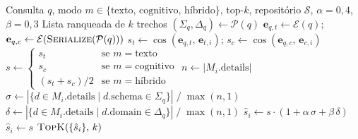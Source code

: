 \documentclass[11pt,a4paper]{article}
\begin{document}
\begin{algorithm}[H]
\caption{Recuperação IS-RAG}\label{alg:retrieve}
\begin{algorithmic}[1]
\Require Consulta $q$, modo $m \in \{\text{texto, cognitivo, híbrido}\}$,
         top-$k$, repositório $\mathcal{S}$, $\alpha{=}0{,}4$, $\beta{=}0{,}3$
\Ensure  Lista ranqueada de $k$ trechos
\State $(\Sigma_q, \Delta_q) \gets \mathcal{P}(q)$
\State $\mathbf{e}_{q,t} \gets \mathcal{E}(q)$;\;
       $\mathbf{e}_{q,c} \gets \mathcal{E}(\textsc{Serialize}(\mathcal{P}(q)))$
  \State $s_t \gets \cos(\mathbf{e}_{q,t},\,\mathbf{e}_{t,i})$;\;
         $s_c \gets \cos(\mathbf{e}_{q,c},\,\mathbf{e}_{c,i})$
  \State $s \gets \begin{cases}
    s_t & \text{se } m = \text{texto} \\
    s_c & \text{se } m = \text{cognitivo} \\
    (s_t + s_c)/2 & \text{se } m = \text{híbrido}
  \end{cases}$
  \State $n \gets |M_i.\text{details}|$
  \State $\sigma \gets |\{d \in M_i.\text{details} \mid d.\text{schema} \in \Sigma_q\}|
                       \;/\; \max(n,1)$
  \State $\delta \gets |\{d \in M_i.\text{details} \mid d.\text{domain} \in \Delta_q\}|
                       \;/\; \max(n,1)$
    \State $\hat{s}_i \gets s \cdot (1 + \alpha\,\sigma + \beta\,\delta)$
  \Else
    \State $\hat{s}_i \gets s$
  \EndIf
\EndFor
\State \Return $\textsc{TopK}(\{\hat{s}_i\},\,k)$
\end{algorithmic}
\end{algorithm}
\end{document}
